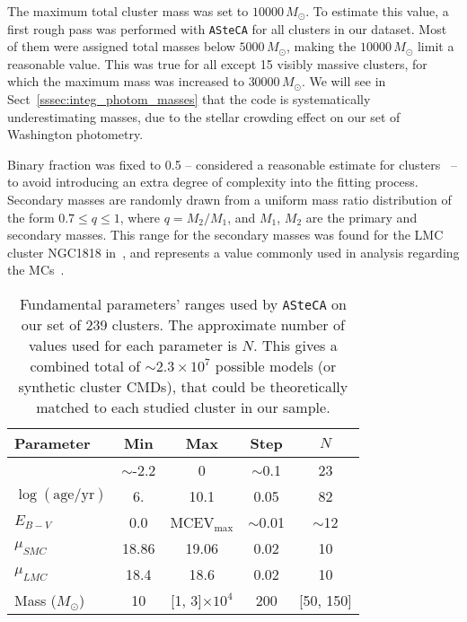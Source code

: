 \documentclass{aa}
\begin{document}
The maximum total cluster mass was set to $10000\,M_{\odot}$.
%
To estimate this value, a first rough pass was performed with
\texttt{ASteCA} for all clusters in our dataset. Most of them were assigned
total masses below $5000\,M_{\odot}$, making the $10000\,M_{\odot}$ limit a
reasonable value.
%
This was true for all except 15 visibly massive clusters, for which the
maximum mass was increased to $30000\,M_{\odot}$. We will see
in Sect~\ref{sssec:integ_photom_masses} that the code is systematically
underestimating masses, due to the stellar crowding effect on our set of
Washington photometry.

Binary fraction was fixed to 0.5 -- considered a
reasonable estimate for clusters~\citep{von_Hippel_2005,Sollima_2010} -- to
avoid introducing an extra degree of complexity into the fitting process.
Secondary masses are randomly drawn from a uniform mass ratio distribution of
the form $0.7{\le}q{\le}1$, where $q{=}M_2/M_1$, and $M_1$, $M_2$ are the
primary and secondary masses. This range for the secondary masses was found for
the LMC cluster NGC1818 in~\cite{Elson_1998}, and represents a value
commonly used in analysis regarding the MCs~\citep[see][and references therein]
{Rubele_2011}.

\begin{table}
\centering
\caption{Fundamental parameters' ranges used by \texttt{ASteCA} on our set
of 239 clusters. The approximate number of values used for each parameter is
$N$. This gives a combined total of ${\sim}2.3 {\times}10^7$ possible models 
(or synthetic cluster CMDs), that could be theoretically matched to each studied
cluster in our sample.}
\label{tab:ga-range}
\begin{tabular}{lcccc}
\hline\hline
 Parameter & Min & Max & Step & $N$\\
\hline
[Fe/H] & $\sim$-2.2 & 0 & $\sim$0.1 & 23\\
$\log\mathrm{(age/yr)}$ & 6. & 10.1 & 0.05 & 82\\
$E_{B-V}$ & 0.0 & MCEV$_{\max}$ & ${\sim}$0.01 & $\sim$12\\
$\mu_{SMC}$ & 18.86 & 19.06 & 0.02 & 10\\
$\mu_{LMC}$ & 18.4 & 18.6 & 0.02 & 10\\
Mass ($M_{\odot}$) & 10 & [1, 3]${\times}10^{4}$ & 200 & [50, 150]\\
\hline
\end{tabular}
\end{table}
\end{document}
